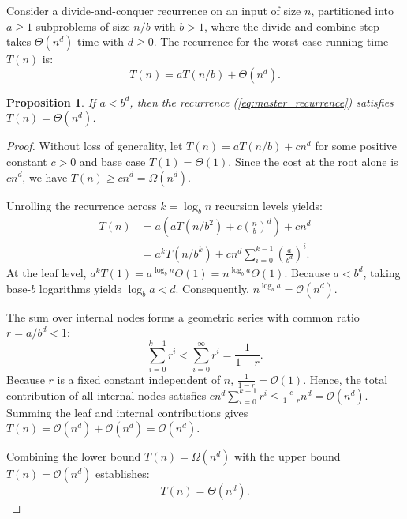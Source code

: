 \documentclass[11pt, letterpaper]{article}
\newtheorem{proposition}{Proposition}[section]
\begin{document}
Consider a divide-and-conquer recurrence on an input of size $n$, partitioned into $a \ge 1$ subproblems of size $n/b$ with $b > 1$, where the divide-and-combine step takes $\Theta(n^d)$ time with $d \ge 0$. The recurrence for the worst-case running time $T(n)$ is:
\begin{equation}
    T(n) = a T(n/b) + \Theta(n^d).
    \label{eq:master_recurrence}
\end{equation}

\begin{proposition}
If $a < b^d$, then the recurrence (\ref{eq:master_recurrence}) satisfies $T(n) = \Theta(n^d)$.
\end{proposition}
\begin{proof}
Without loss of generality, let $T(n) = a T(n/b) + c n^d$ for some positive constant $c > 0$ and base case $T(1) = \Theta(1)$. Since the cost at the root alone is $c n^d$, we have $T(n) \ge c n^d = \Omega(n^d)$.

Unrolling the recurrence across $k = \log_b n$ recursion levels yields:
\begin{align}
    T(n) &= a \left( a T(n/b^2) + c \left(\frac{n}{b}\right)^d \right) + c n^d \nonumber \\
         &= a^k T(n/b^k) + c n^d \sum_{i=0}^{k-1} \left( \frac{a}{b^d} \right)^i.
\end{align}
At the leaf level, $a^k T(1) = a^{\log_b n} \Theta(1) = n^{\log_b a} \Theta(1)$. Because $a < b^d$, taking base-$b$ logarithms yields $\log_b a < d$. Consequently, $n^{\log_b a} = \mathcal{O}(n^d)$.

The sum over internal nodes forms a geometric series with common ratio $r = a/b^d < 1$:
\begin{equation}
    \sum_{i=0}^{k-1} r^i < \sum_{i=0}^{\infty} r^i = \frac{1}{1 - r}.
\end{equation}
Because $r$ is a fixed constant independent of $n$, $\frac{1}{1 - r} = \mathcal{O}(1)$. Hence, the total contribution of all internal nodes satisfies $c n^d \sum_{i=0}^{k-1} r^i \le \frac{c}{1 - r} n^d = \mathcal{O}(n^d)$. Summing the leaf and internal contributions gives $T(n) = \mathcal{O}(n^d) + \mathcal{O}(n^d) = \mathcal{O}(n^d)$.

Combining the lower bound $T(n) = \Omega(n^d)$ with the upper bound $T(n) = \mathcal{O}(n^d)$ establishes:
\begin{equation}
    T(n) = \Theta(n^d).
\end{equation}
\end{proof}
\end{document}
